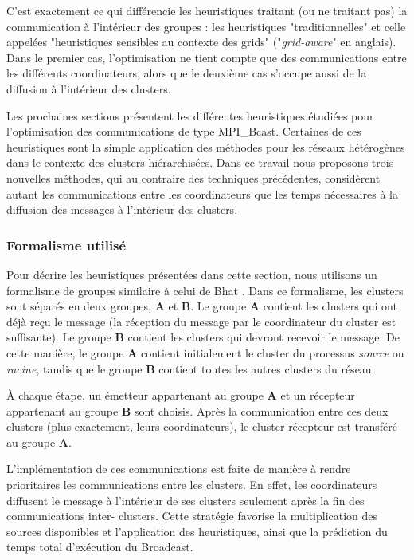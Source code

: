 C'est exactement ce qui différencie les heuristiques traitant (ou
ne traitant pas) la communication à l'intérieur des groupes : les
heuristiques "traditionnelles" et celle appelées "heuristiques
sensibles au contexte des grids" ("\emph{grid-aware}"
en anglais). Dans le premier cas, l'optimisation ne tient compte que
des communications entre les différents coordinateurs, alors que le
deuxième cas s'occupe aussi de la diffusion à l'intérieur des  clusters. 


Les prochaines sections présentent les différentes heuristiques étudiées
pour l'optimisation des communications de type MPI\_Bcast. Certaines
de ces heuristiques sont la simple application des méthodes pour les
réseaux hétérogènes dans le contexte des  clusters hiérarchisées. Dans
ce travail nous proposons trois nouvelles méthodes, qui au contraire
des techniques précédentes, considèrent autant les communications
entre les coordinateurs que les temps nécessaires à la diffusion des
messages à l'intérieur des  clusters.


\subsubsection*{Formalisme utilisé}

Pour décrire les heuristiques présentées dans cette section, nous
utilisons un formalisme de groupes similaire à celui de Bhat \cite{Bhat03}.
Dans ce formalisme, les  clusters sont séparés en deux groupes, \textbf{A}
et \textbf{B}. Le groupe \textbf{A} contient les  clusters qui ont déjà
reçu le message (la réception du message par le coordinateur du
 cluster est suffisante). Le groupe \textbf{B} contient les  clusters
qui devront recevoir le message. De cette manière, le groupe \textbf{A}
contient initialement le  cluster du processus \emph{source} ou \emph{racine},
tandis que le groupe \textbf{B} contient toutes les autres  clusters
du réseau.

À chaque étape, un émetteur appartenant au groupe \textbf{A} et un
récepteur appartenant au groupe \textbf{B} sont choisis. Après la
communication entre ces deux  clusters (plus exactement, leurs coordinateurs),
le cluster récepteur est transféré au groupe \textbf{A}. 

L'implémentation de ces communications est faite de manière à rendre
prioritaires les communications entre les  clusters. En effet, les coordinateurs
diffusent le message à l'intérieur de ses  clusters seulement après
la fin des communications inter- clusters. Cette stratégie favorise
la multiplication des sources disponibles et l'application des heuristiques,
ainsi que la prédiction du temps total d'exécution du Broadcast.


